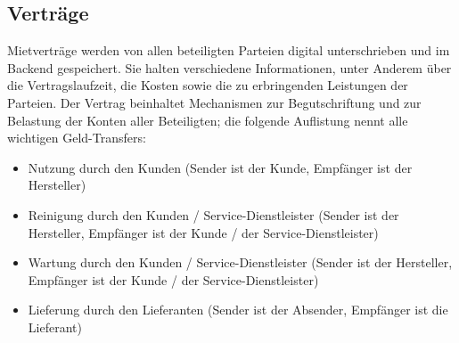 \subsection{Verträge}
\label{subsec:iot_usecase:solution:contracts}
Mietverträge werden von allen beteiligten Parteien digital unterschrieben und im Backend gespeichert. Sie halten verschiedene Informationen, unter Anderem über die Vertragslaufzeit, die Kosten sowie die zu erbringenden Leistungen der Parteien. Der Vertrag beinhaltet Mechanismen zur Begutschriftung und zur Belastung der Konten aller Beteiligten; die folgende Auflistung nennt alle wichtigen Geld-Transfers:
\begin{itemize}
  \item Nutzung durch den Kunden (Sender ist der Kunde, Empfänger ist der Hersteller)
  \item Reinigung durch den Kunden / Service-Dienstleister (Sender ist der Hersteller, Empfänger ist der Kunde / der Service-Dienstleister)
  \item Wartung durch den Kunden / Service-Dienstleister (Sender ist der Hersteller, Empfänger ist der Kunde / der Service-Dienstleister)
  \item Lieferung durch den Lieferanten (Sender ist der Absender, Empfänger ist die Lieferant)
\end{itemize}

